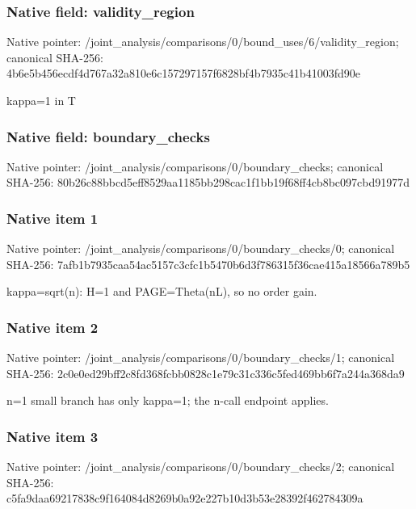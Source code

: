 \documentclass[10pt,a4paper]{article}
\begin{document}
\subsubsection{Native field: validity\_\allowbreak{}region}
Native pointer: /joint\_\allowbreak{}analysis/comparisons/0/bound\_\allowbreak{}uses/6/validity\_\allowbreak{}region; canonical SHA-256: 4b6e5b456ecdf4d767a32a810e6c157297157f6828bf4b7935c41b41003fd90e

\begingroup\raggedright\sloppy kappa=\allowbreak{}1 in T\par\endgroup

\subsubsection{Native field: boundary\_\allowbreak{}checks}
Native pointer: /joint\_\allowbreak{}analysis/comparisons/0/boundary\_\allowbreak{}checks; canonical SHA-256: 80b26c88bbcd5eff8529aa1185bb298cac1f1bb19f68ff4cb8bc097cbd91977d

\subsubsection{Native item 1}
Native pointer: /joint\_\allowbreak{}analysis/comparisons/0/boundary\_\allowbreak{}checks/0; canonical SHA-256: 7afb1b7935caa54ac5157c3cfc1b5470b6d3f786315f36cae415a18566a789b5

\begingroup\raggedright\sloppy kappa=\allowbreak{}sqrt(n):\allowbreak{} H=\allowbreak{}1 and PAGE=\allowbreak{}Theta(nL),\allowbreak{} so no order gain.\par\endgroup

\subsubsection{Native item 2}
Native pointer: /joint\_\allowbreak{}analysis/comparisons/0/boundary\_\allowbreak{}checks/1; canonical SHA-256: 2c0e0ed29bff2c8fd368fcbb0828c1e79c31c336c5fed469bb6f7a244a368da9

\begingroup\raggedright\sloppy n=\allowbreak{}1 small branch has only kappa=\allowbreak{}1;\allowbreak{} the n-call endpoint applies.\par\endgroup

\subsubsection{Native item 3}
Native pointer: /joint\_\allowbreak{}analysis/comparisons/0/boundary\_\allowbreak{}checks/2; canonical SHA-256: c5fa9daa69217838c9f164084d8269b0a92e227b10d3b53e28392f462784309a
\end{document}
